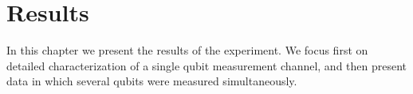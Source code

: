 \chapter{Results} \label{ch:results}

In this chapter we present the results of the experiment.
We focus first on detailed characterization of a single qubit measurement channel, and then present data in which several qubits were measured simultaneously.

 \label{sec:ch:results:characterization}










